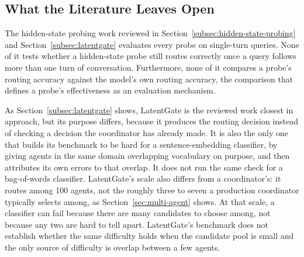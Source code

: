 \subsection{What the Literature Leaves Open}
\label{subsec:literature-gap}

The hidden-state probing work reviewed in Section~\ref{subsec:hidden-state-probing} and Section~\ref{subsec:latentgate} evaluates every probe on single-turn queries. None of it tests whether a hidden-state probe still routes correctly once a query follows more than one turn of conversation. Furthermore, none of it compares a probe's routing accuracy against the model's own routing accuracy, the comparison that defines a probe's effectiveness as an evaluation mechanism.

As Section~\ref{subsec:latentgate} shows, LatentGate is the reviewed work closest in approach, but its purpose differs, because it produces the routing decision instead of checking a decision the coordinator has already made. It is also the only one that builds its benchmark to be hard for a sentence-embedding classifier, by giving agents in the same domain overlapping vocabulary on purpose, and then attributes its own errors to that overlap. It does not run the same check for a bag-of-words classifier. LatentGate's scale also differs from a coordinator's: it routes among 100 agents, not the roughly three to seven a production coordinator typically selects among, as Section~\ref{sec:multi-agent} shows. At that scale, a classifier can fail because there are many candidates to choose among, not because any two are hard to tell apart. LatentGate's benchmark does not establish whether the same difficulty holds when the candidate pool is small and the only source of difficulty is overlap between a few agents.

